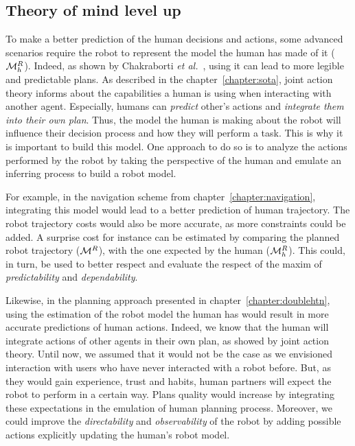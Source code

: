 \documentclass[a4paper,11pt,twoside]{StyleThese}
\begin{document}
\subsection*{Theory of mind level up}
To make a better prediction of the human decisions and actions, some advanced scenarios require the robot to represent the model the human has made of it ($\mathcal{M}^R_h$). Indeed, as shown by Chakraborti \textit{et al.}~\cite{chakraborti2017plan}, using it can lead to more legible and predictable plans. As described in the chapter~\ref{chapter:sota}, joint action theory informs about the capabilities a human is using when interacting with another agent. Especially, humans can \textit{predict} other's actions and \textit{integrate them into their own plan}. Thus, the model the human is making about the robot will influence their decision process and how they will perform a task. This is why it is important to build this model. One approach to do so is to analyze the actions performed by the robot by taking the perspective of the human and emulate an inferring process to build a robot model.

For example, in the navigation scheme from chapter~\ref{chapter:navigation}, integrating this model would lead to a better prediction of human trajectory. The robot trajectory costs would also be more accurate, as more constraints could be added. A surprise cost for instance can be estimated by comparing the planned robot trajectory ($\mathcal{M}^R$), with the one expected by the human ($\mathcal{M}^R_h$). This could, in turn, be used to better respect and evaluate the respect of the maxim of \textit{predictability} and \textit{dependability}.

Likewise, in the planning approach presented in chapter~\ref{chapter:doublehtn}, using the estimation of the robot model the human has would result in more accurate predictions of human actions. Indeed, we know that the human will integrate actions of other agents  in their own plan, as showed by joint action theory. Until now, we assumed that it would not be the case as we envisioned interaction with users who have never interacted with a robot before. But, as they would gain experience, trust and habits, human partners will expect the robot to perform in a certain way. Plans quality would increase by integrating these expectations in the emulation of human planning process. Moreover, we could improve the \textit{directability} and \textit{observability} of the robot by adding possible actions explicitly updating the human's robot model.


\ifdefined{}
\else


\end{document}
